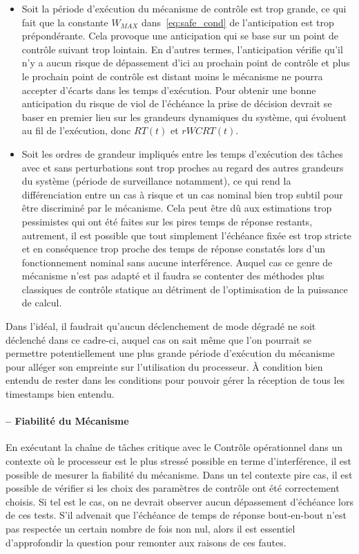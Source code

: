 \documentclass[french, a4paper, 11pt, twoside, pdftex]{StyleThese}
\begin{document}
    	\begin{itemize}
    		\item Soit la période d'exécution du mécanisme de contrôle est trop grande, ce qui fait que la constante $W_{MAX}$ dans~\autoref{eq:safe_cond} de l'anticipation est trop prépondérante. Cela provoque une anticipation qui se base sur un point de contrôle suivant trop lointain. En d'autres termes, l'anticipation vérifie qu'il n'y a aucun risque de dépassement d'ici au prochain point de contrôle et plus le prochain point de contrôle est distant moins le mécanisme ne pourra accepter d'écarts dans les temps d'exécution. Pour obtenir une bonne anticipation du risque de viol de l'échéance la prise de décision devrait se baser en premier lieu sur les grandeurs dynamiques du système, qui évoluent au fil de l'exécution, donc $RT(t)$ et $rWCRT(t)$.
    		\item Soit les ordres de grandeur impliqués entre les temps d'exécution des tâches avec et sans perturbations sont trop proches au regard des autres grandeurs du système (période de surveillance notamment), ce qui rend la différenciation entre un cas à risque et un cas nominal bien trop subtil pour être discriminé par le mécanisme. Cela peut être dû aux estimations trop pessimistes qui ont été faites sur les pires temps de réponse restants, autrement, il est possible que tout simplement l'échéance fixée est trop stricte et en conséquence trop proche des temps de réponse constatés lors d'un fonctionnement nominal sans aucune interférence. Auquel cas ce genre de mécanisme n'est pas adapté et il faudra se contenter des méthodes plus classiques de contrôle statique au détriment de l'optimisation de la puissance de calcul.
    	\end{itemize}
    	Dans l'idéal, il faudrait qu'aucun déclenchement de mode dégradé ne soit déclenché dans ce cadre-ci, auquel cas on sait même que l'on pourrait se permettre potentiellement une plus grande période d'exécution du mécanisme pour alléger son empreinte sur l'utilisation du processeur. À condition bien entendu de rester dans les conditions pour pouvoir gérer la réception de tous les timestamps bien entendu.
    	
    	\paragraph{ -- Fiabilité du Mécanisme}
        En exécutant la chaîne de tâches critique avec le Contrôle opérationnel dans un contexte où le processeur est le plus stressé possible en terme d'interférence, il est possible de mesurer la fiabilité du mécanisme.
        Dans un tel contexte pire cas, il est possible de vérifier si les choix des paramètres de contrôle ont été correctement choisis. Si tel est le cas, on ne devrait observer aucun dépassement d'échéance lors de ces tests. 
        S'il advenait que l'échéance de temps de réponse bout-en-bout n'est pas respectée un certain nombre de fois non nul, alors il est essentiel d'approfondir la question pour remonter aux raisons de ces fautes.
        	
\end{document}
